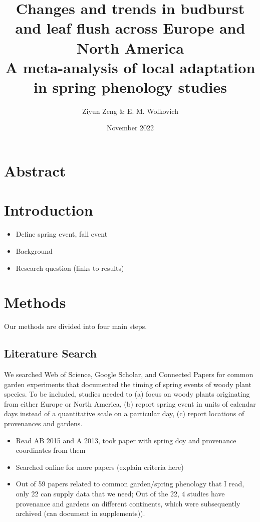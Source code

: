 \documentclass{article}
\begin{document}
\title{{\huge Changes and trends in budburst and leaf flush across Europe and North America} \\A meta-analysis of local adaptation in spring phenology studies}
\author{Ziyun Zeng \& E. M. Wolkovich}
\date{November 2022}
\maketitle 


\newpage

\section*{Abstract}

\section{Introduction}
\begin{itemize}
\item Define spring event, fall event
\item Background 
\item Research question (links to results)
\end{itemize}

\section{Methods}
Our methods are divided into four main steps. 

\subsection{Literature Search}
We searched Web of Science, Google Scholar, and Connected Papers for common garden experiments that documented the timing of spring events of woody plant species. To be included, studies needed to (a) focus on woody plants originating from either Europe or North America, (b) report spring event in units of calendar days instead of a quantitative scale on a particular day, (c) report locations of provenances and gardens.  
  \begin{itemize}
\item Read AB 2015 and A 2013, took paper with spring doy and provenance coordinates from them
\item Searched online for more papers (explain criteria here)
\item Out of 59 papers related to common garden/spring phenology that I read, only 22 can supply data that we need; Out of the 22, 4 studies have provenance and gardens on different continents, which were subsequently archived (can document in supplements)).
\end{itemize}
\end{document}
